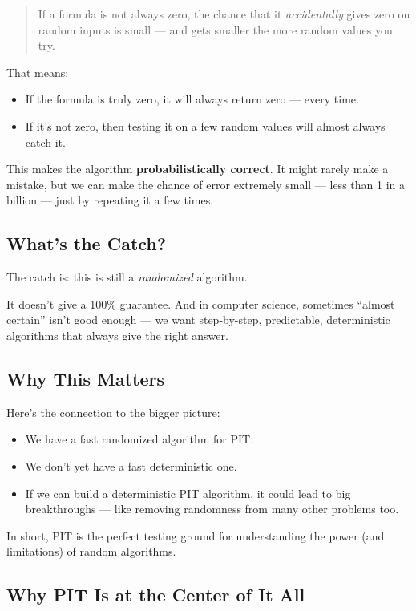 \begin{quote}
If a formula is not always zero, the chance that it \textit{accidentally} gives zero on random inputs is small — and gets smaller the more random values you try.
\end{quote}

That means:
\begin{itemize}
  \item If the formula is truly zero, it will always return zero — every time.
  \item If it’s not zero, then testing it on a few random values will almost always catch it.
\end{itemize}

This makes the algorithm \textbf{probabilistically correct}. It might rarely make a mistake, but we can make the chance of error extremely small — less than 1 in a billion — just by repeating it a few times.

\subsection*{What’s the Catch?}

The catch is: this is still a \textit{randomized} algorithm.

It doesn’t give a 100\% guarantee. And in computer science, sometimes “almost certain” isn’t good enough — we want step-by-step, predictable, deterministic algorithms that always give the right answer.

\subsection*{Why This Matters}

Here’s the connection to the bigger picture:

\begin{itemize}
  \item We have a fast randomized algorithm for PIT.
  \item We don’t yet have a fast deterministic one.
  \item If we can build a deterministic PIT algorithm, it could lead to big breakthroughs — like removing randomness from many other problems too.
\end{itemize}

In short, PIT is the perfect testing ground for understanding the power (and limitations) of random algorithms.



\subsection*{Why PIT Is at the Center of It All}

